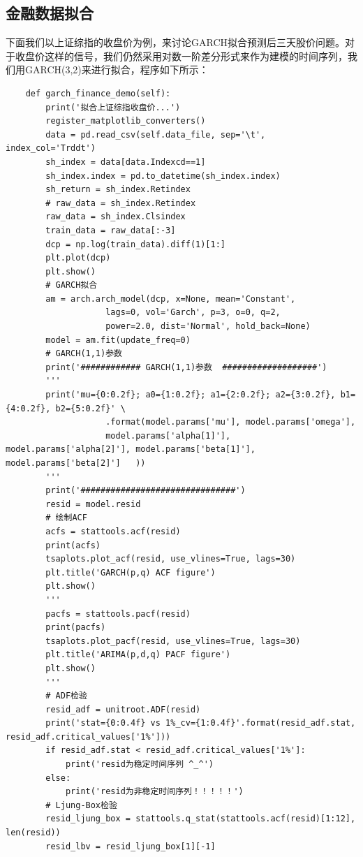 \documentclass{article}
\begin{document}
\subsection{金融数据拟合}
下面我们以上证综指的收盘价为例，来讨论GARCH拟合预测后三天股价问题。对于收盘价这样的信号，我们仍然采用对数一阶差分形式来作为建模的时间序列，我们用GARCH(3,2)来进行拟合，程序如下所示：
\begin{lstlisting}
    def garch_finance_demo(self):
        print('拟合上证综指收盘价...')
        register_matplotlib_converters()
        data = pd.read_csv(self.data_file, sep='\t', index_col='Trddt')
        sh_index = data[data.Indexcd==1]
        sh_index.index = pd.to_datetime(sh_index.index)
        sh_return = sh_index.Retindex
        # raw_data = sh_index.Retindex
        raw_data = sh_index.Clsindex
        train_data = raw_data[:-3]
        dcp = np.log(train_data).diff(1)[1:] 
        plt.plot(dcp)
        plt.show()
        # GARCH拟合
        am = arch.arch_model(dcp, x=None, mean='Constant', 
                    lags=0, vol='Garch', p=3, o=0, q=2, 
                    power=2.0, dist='Normal', hold_back=None)
        model = am.fit(update_freq=0)
        # GARCH(1,1)参数
        print('############ GARCH(1,1)参数  ###################')
        '''
        print('mu={0:0.2f}; a0={1:0.2f}; a1={2:0.2f}; a2={3:0.2f}, b1={4:0.2f}, b2={5:0.2f}' \
                    .format(model.params['mu'], model.params['omega'], 
                    model.params['alpha[1]'], model.params['alpha[2]'], model.params['beta[1]'], model.params['beta[2]']   ))
        '''
        print('###############################')
        resid = model.resid
        # 绘制ACF
        acfs = stattools.acf(resid)
        print(acfs)
        tsaplots.plot_acf(resid, use_vlines=True, lags=30)
        plt.title('GARCH(p,q) ACF figure')
        plt.show()
        '''
        pacfs = stattools.pacf(resid)
        print(pacfs)
        tsaplots.plot_pacf(resid, use_vlines=True, lags=30)
        plt.title('ARIMA(p,d,q) PACF figure')
        plt.show()
        '''
        # ADF检验
        resid_adf = unitroot.ADF(resid)
        print('stat={0:0.4f} vs 1%_cv={1:0.4f}'.format(resid_adf.stat, resid_adf.critical_values['1%']))
        if resid_adf.stat < resid_adf.critical_values['1%']:
            print('resid为稳定时间序列 ^_^')
        else:
            print('resid为非稳定时间序列！！！！！')
        # Ljung-Box检验
        resid_ljung_box = stattools.q_stat(stattools.acf(resid)[1:12], len(resid))
        resid_lbv = resid_ljung_box[1][-1]

\end{lstlisting}
\end{document}
